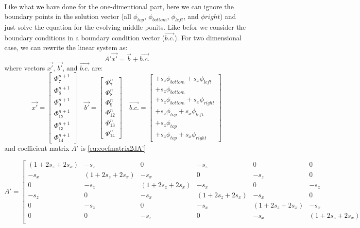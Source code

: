 \begin{landscape}
\end{landscape}



Like what we have done for the one-dimentional part, here we can ignore the boundary points in the solution vector (all $\phi_{top}$, $\phi_{bottom}$, $\phi_{left}$, and $\phi{right}$) and just solve the equation for the evolving middle ponits. Like befor we consider the boundary conditions in a boundary condition vector ($\vec{b.c.}$). For two dimensional case, we can rewrite the linear system as:
\begin{equation}
A'\vec{x'}=\vec{b}+\vec{b.c.}
\end{equation} 
where vectors $\vec{x'}$, $\vec{b'}$, and $\vec{b.c.}$ are:
\begin{equation}
\vec{x'}=\begin{bmatrix}
 \Phi^{n+1}_{7} \\ \Phi^{n+1}_{8} \\ \Phi^{n+1}_{9} \\  \Phi^{n+1}_{12} \\ \Phi^{n+1}_{13} \\ \Phi^{n+1}_{14}
\end{bmatrix}
\quad
\vec{b'}=\begin{bmatrix}
 \Phi^{n}_{7} \\ \Phi^{n}_{8} \\ \Phi^{n}_{9} \\  \Phi^{n}_{12} \\ \Phi^{n}_{13} \\ \Phi^{n}_{14}
\end{bmatrix}
\quad
\vec{b.c.}= \begin{bmatrix}
+s_{z} \phi_{bottom} +s_{x} \phi_{left} \\ +s_{z} \phi_{bottom} \\ +s_{z} \phi_{bottom} + s_{x} \phi_{right}  \\ +s_{z} \phi_{top} + s_{x} \phi_{left} \\ +s_{z} \phi_{top} \\ +s_{z} \phi_{top} + s_{x} \phi_{right}
\end{bmatrix}
\end{equation}
and coefficient matrix $A'$ is \ref{eq:coefmatrix2dA'}

\begin{table}[ht]
\begin{equation}
A' = \begin{bmatrix}
	   (1+2s_z +2 s_x) & -s_x & 0 & -s_z & 0 & 0  \\
   	   -s_x & (1+2s_z +2 s_x) &-s_x & 0 & -s_z & 0   \\
   	   0 & -s_x & (1+2s_z +2 s_x) &-s_x & 0 & -s_z   \\
  	   -s_z & 0 & -s_x & (1+2s_z +2 s_x) &-s_x & 0   \\
   	   0 & -s_z & 0 & -s_x & (1+2s_z +2 s_x) &-s_x  \\
   	   0 & 0 & -s_z & 0 & -s_x & (1+2s_z +2 s_x)  \\
     \end{bmatrix}
     \label{eq:coefmatrix2dA'}
\end{equation}
\end{table}


